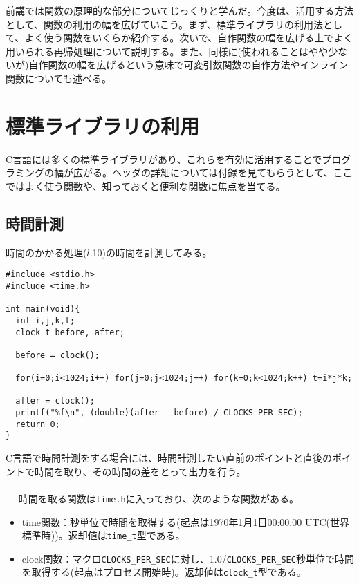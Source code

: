 前講では関数の原理的な部分についてじっくりと学んだ。今度は、活用する方法として、関数の利用の幅を広げていこう。まず、標準ライブラリの利用法として、よく使う関数をいくらか紹介する。次いで、自作関数の幅を広げる上でよく用いられる再帰処理について説明する。また、同様に(使われることはやや少ないが)自作関数の幅を広げるという意味で可変引数関数の自作方法やインライン関数についても述べる。

\section{標準ライブラリの利用}
C言語には多くの標準ライブラリがあり、これらを有効に活用することでプログラミングの幅が広がる。ヘッダの詳細については付録を見てもらうとして、ここではよく使う関数や、知っておくと便利な関数に焦点を当てる。
\subsection{時間計測}
\begin{boxnote}
時間のかかる処理($l$.10)の時間を計測してみる。
\begin{lstlisting}[caption=時間計測の方法,label=program7_1]
#include <stdio.h>
#include <time.h>

int main(void){
  int i,j,k,t;
  clock_t before, after;

  before = clock();

  for(i=0;i<1024;i++) for(j=0;j<1024;j++) for(k=0;k<1024;k++) t=i*j*k;

  after = clock();
  printf("%f\n", (double)(after - before) / CLOCKS_PER_SEC);
  return 0;
}
\end{lstlisting}
\end{boxnote}
C言語で時間計測をする場合には、時間計測したい直前のポイントと直後のポイントで時間を取り、その時間の差をとって出力を行う。
\\ \\　
時間を取る関数は\verb|time.h|に入っており、次のような関数がある。
\begin{itemize}
\item time関数：秒単位で時間を取得する(起点は1970年1月1日00:00:00 UTC(世界標準時))。返却値は\verb|time_t|型である。
\item clock関数：マクロ\verb|CLOCKS_PER_SEC|に対し、1.0/\verb|CLOCKS_PER_SEC|秒単位で時間を取得する(起点はプロセス開始時)。返却値は\verb|clock_t|型である。
\end{itemize}


